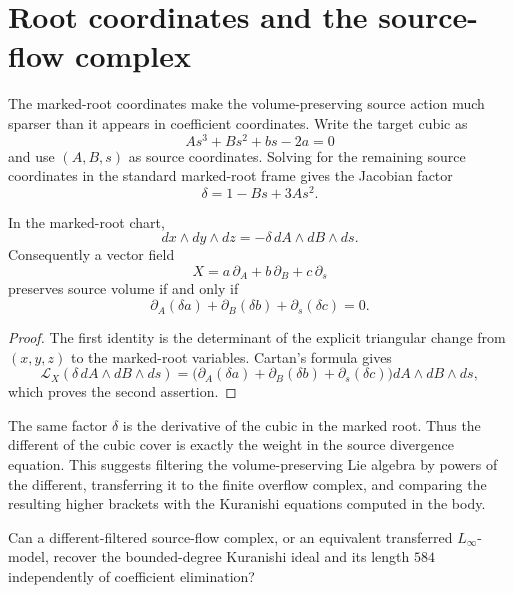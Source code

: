\section{Root coordinates and the source-flow complex}
\label{app:root-coordinate-source-flow}

The marked-root coordinates make the volume-preserving source action much
sparser than it appears in coefficient coordinates.  Write the target cubic
as
\[
As^3+Bs^2+bs-2a=0
\]
and use \((A,B,s)\) as source coordinates.  Solving for the remaining source
coordinates in the standard marked-root frame gives the Jacobian factor
\[
\delta=1-Bs+3As^2.
\]

\begin{proposition}
\label{prop:root-coordinate-divergence}
In the marked-root chart,
\[
dx\wedge dy\wedge dz
=-\delta\,dA\wedge dB\wedge ds.
\]
Consequently a vector field
\[
X=a\,\partial_A+b\,\partial_B+c\,\partial_s
\]
preserves source volume if and only if
\[
\partial_A(\delta a)+\partial_B(\delta b)+\partial_s(\delta c)=0.
\]
\end{proposition}

\begin{proof}
The first identity is the determinant of the explicit triangular change
from \((x,y,z)\) to the marked-root variables.  Cartan's formula gives
\[
\mathcal L_X(\delta\,dA\wedge dB\wedge ds)
=
\bigl(
\partial_A(\delta a)+\partial_B(\delta b)+\partial_s(\delta c)
\bigr)dA\wedge dB\wedge ds,
\]
which proves the second assertion.
\end{proof}

The same factor \(\delta\) is the derivative of the cubic in the marked
root.  Thus the different of the cubic cover is exactly the weight in the
source divergence equation.  This suggests filtering the volume-preserving
Lie algebra by powers of the different, transferring it to the finite
overflow complex, and comparing the resulting higher brackets with the
Kuranishi equations computed in the body.

\begin{question}
\label{q:different-filtered-reconstruction}
Can a different-filtered source-flow complex, or an equivalent transferred
\(L_\infty\)-model, recover the bounded-degree Kuranishi ideal and its
length \(584\) independently of coefficient elimination?
\end{question}
